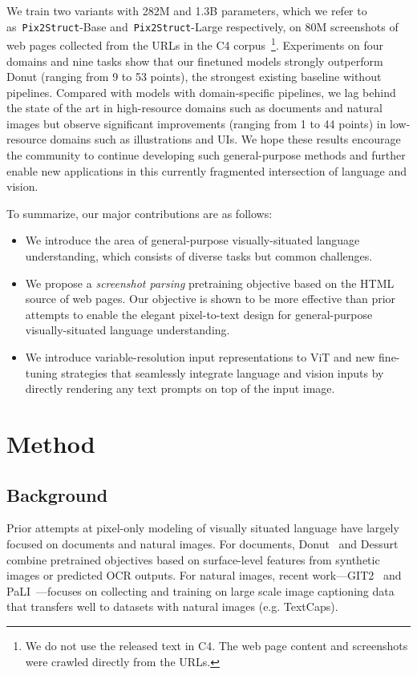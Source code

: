 \documentclass{article} \usepackage[accepted]{icml2023}
\newcommand\ourmodel{{\texttt{Pix2Struct}}}
\begin{document}
We train two variants with 282M and 1.3B parameters, which we refer to as~\ourmodel-Base and~\ourmodel-Large respectively, on 80M screenshots of web pages collected from the URLs in the C4 corpus~\citep{t5}\footnote{We do not use the released text in C4. The web page content and screenshots were crawled directly from the URLs.}. Experiments on four domains and nine tasks show that our finetuned models strongly outperform Donut (ranging from 9 to 53 points), the strongest existing baseline without pipelines. Compared with models with domain-specific pipelines, we lag behind the state of the art in high-resource domains such as documents and natural images but observe significant improvements (ranging from 1 to 44 points) in low-resource domains such as illustrations and UIs. We hope these results encourage the community to continue developing such general-purpose methods and further enable new applications in this currently fragmented intersection of language and vision. 

To summarize, our major contributions are as follows:
\begin{itemize}[leftmargin=20pt,topsep=0pt,itemsep=0pt]
    \item We introduce the area of general-purpose visually-situated language understanding, which consists of diverse tasks but common challenges.
    \item We propose a \emph{screenshot parsing} pretraining objective based on the HTML source of web pages. Our objective is shown to be more effective than prior attempts to enable the elegant pixel-to-text design for general-purpose visually-situated language understanding.
    \item We introduce variable-resolution input representations to ViT and new fine-tuning strategies that seamlessly integrate language and vision inputs by directly rendering any text prompts on top of the input image.
\end{itemize}

\section{Method}
\subsection{Background} 
Prior attempts at pixel-only modeling of visually situated language have largely focused on documents and natural images. For documents, Donut~\citep{donut} and Dessurt~\citep{dessurt} combine pretrained objectives based on surface-level features from synthetic images or predicted OCR outputs. For natural images, recent work---GIT2~\citep{wang2022git} and PaLI~\citep{pali}---focuses on collecting and training on large scale image captioning data that transfers well to datasets with natural images (e.g. TextCaps). 
\end{document}
